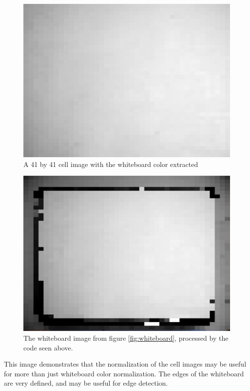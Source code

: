 \documentclass[]{article}
\begin{document}
\begin{figure}[H]
\centering
\includegraphics[scale=0.25]{images/wb_crop_background_2}
\caption{A 41 by 41 cell image with the whiteboard color extracted}
\end{figure}

\begin{figure}[H]
\centering
\includegraphics[scale=0.25]{images/wb_background}
\caption{The whiteboard image from figure \ref{fig:whiteboard}, processed by the code seen above.}
\end{figure}

This image demonstrates that the normalization of the cell images may be useful for more than just whiteboard color normalization.  The edges of the whiteboard are very defined, and may be useful for edge detection.
\end{document}
